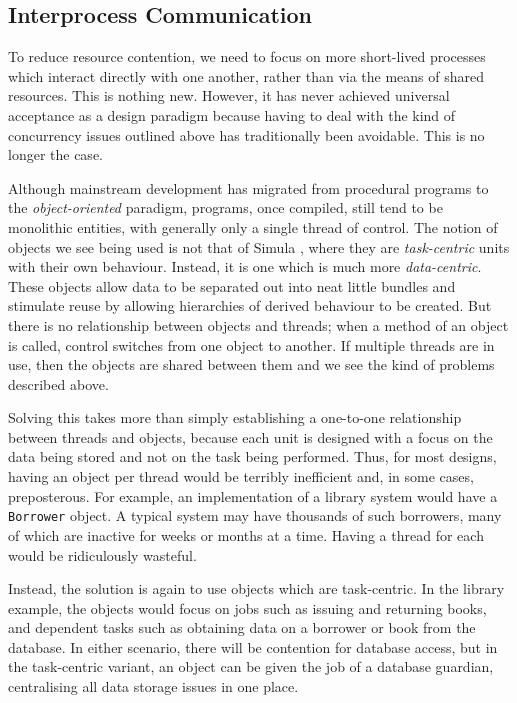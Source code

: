 \subsection{Interprocess Communication}
\label{ipc}

To reduce resource contention, we need to focus on more short-lived
processes which interact directly with one another, rather than via
the means of shared resources.  This is nothing new.  However, it has
never achieved universal acceptance as a design paradigm because
having to deal with the kind of concurrency issues outlined above has
traditionally been avoidable.  This is no longer the case.

Although mainstream development has migrated from procedural programs
to the \emph{object-oriented} paradigm, programs, once compiled, still
tend to be monolithic entities, with generally only a single thread of
control.  The notion of objects we see being used is not that of
Simula \cite{simula}, where they are \emph{task-centric} units with
their own behaviour.  Instead, it is one which is much more
\emph{data-centric}.  These objects allow data to be separated out
into neat little bundles and stimulate reuse by allowing hierarchies
of derived behaviour to be created.  But there is no relationship
between objects and threads; when a method of an object is called,
control switches from one object to another.  If multiple threads are
in use, then the objects are shared between them and we see the kind
of problems described above.

Solving this takes more than simply establishing a one-to-one
relationship between threads and objects, because each unit is
designed with a focus on the data being stored and not on the task
being performed.  Thus, for most designs, having an object per thread
would be terribly inefficient and, in some cases, preposterous.  For
example, an implementation of a library system would have a
\texttt{Borrower} object.  A typical system may have thousands of such
borrowers, many of which are inactive for weeks or months at a time.
Having a thread for each would be ridiculously wasteful.

Instead, the solution is again to use objects which are task-centric.
In the library example, the objects would focus on jobs such as
issuing and returning books, and dependent tasks such as obtaining
data on a borrower or book from the database.  In either scenario,
there will be contention for database access, but in the task-centric
variant, an object can be given the job of a database guardian,
centralising all data storage issues in one place.

